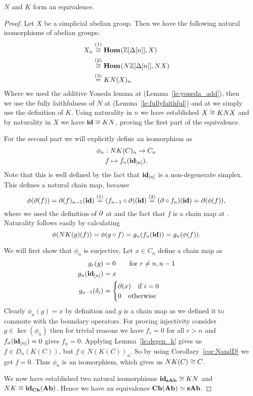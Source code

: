 \begin{theorem}
	$N$ and $K$ form an equivalence.
\end{theorem}
\begin{proof}
	Let $X$ be a simplicial abelian group. Then we have the following natural isomorphisms of abelian groups:
	\begin{align*}
		X_n &\stackrel{(1)}{\cong} \mathbf{Hom}_{}(\mathbb{Z}[\Delta[n]], X) \\
			&\stackrel{(2)}{\cong} \mathbf{Hom}_{}(N\mathbb{Z}[\Delta[n]], NX) \\
			&\stackrel{(3)}{=} KN(X)_n
	\end{align*}
	Where we used the additive Yoneda lemma at  (Lemma~\ref{le:yoneda_add}), then we use the fully faithfulness of $N$ at  (Lemma~\ref{le:fullyfaithful}) and at  we simply use the definition of $K$. Using naturality in $n$ we have established $X \cong KNX$ and by naturality in $X$ we have $\mathbf{id} \cong KN$, proving the first part of the equivalence.

	For the second part we will explicitly define an isomorphism as
	\begin{gather*}
		\phi_n: NK(C)_n \to C_n \\
		f \mapsto f_n(\mathbf{id}_{[n]}).
	\end{gather*}
	Note that this is well defined by the fact that $\mathbf{id}_{[n]}$ is a non-degenerate simplex. This defines a natural chain map, because
	$$ \phi(\partial(f)) = \partial(f)_{n-1}(\mathbf{id}) \stackrel{(1)}{=} (f_{n-1} \circ \partial)(\mathbf{id}) \stackrel{(2)}{=} (\partial \circ f_n)(\mathbf{id}) = \partial(\phi(f)), $$
	where we used the definition of $\partial$ at  and the fact that $f$ is a chain map at . Naturality follows easily by calculating
	$$ \phi(NK(g)(f)) = \phi(g \circ f) = g_n(f_n(\mathbf{id})) = g_n(\phi(f)). $$

	We will first show that $\phi_n$ is surjective. Let $x \in C_n$ define a chain map as
	\begin{align*}
		g_r(y) &= 0 \qquad \text{for } r \neq n, n-1\\
		g_n(\mathbf{id}_{[n]}) &= x \\
		g_{n-1}(\delta_i) &= \begin{cases}
			\partial(x) \quad\text{if } i = 0 \\
			0 \quad\text{otherwise}
		\end{cases}
	\end{align*}
	Clearly $\phi_n(g) = x$ by definition and $g$ is a chain map as we defined it to commute with the boundary operators. For proving injectivity consider $g \in \ker(\phi_n)$ then for trivial reasons we have $f_r = 0$ for all $r > n$ and $f_n(\mathbf{id}_{[n]}) = 0$ gives $f_n = 0$. Applying Lemma~\ref{le:degen_k} gives us $f \in D_n(K(C))$, but $f \in N(K(C))_n$. So by using Corollary~\ref{cor:NandD} we get $f = 0$. Thus $\phi_n$ is an isomorphism, which gives us $NK(C) \cong C$.

	We now have established two natural isomorphisms $\mathbf{id}_{\mathbf{sAb}} \cong KN$ and $NK \cong \mathbf{id}_\mathbf{Ch}(\mathbf{Ab})$. Hence we have an equivalence $\mathbf{Ch}(\mathbf{Ab}) \simeq \mathbf{sAb}$.
\end{proof}

